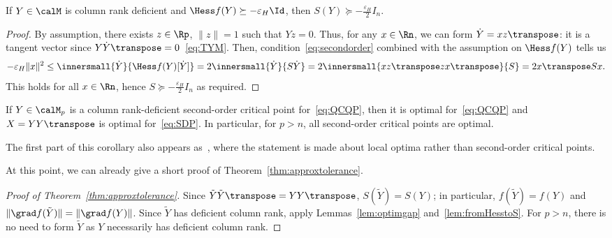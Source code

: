 \documentclass{article}
\newcommand{\1}{\mathbf{1}}
\begin{document}
\begin{lemma}\label{lem:fromHesstoS}
	If $Y\in\calM$ is column rank deficient and $\Hess f(Y) \succeq -\varepsilon_H \Id$, then $S(Y) \succeq -\frac{\varepsilon_H}{2} I_n$.
\end{lemma}
\begin{proof}
	By assumption, there exists $z\in\Rp$, $\|z\| = 1$ such that $Yz = 0$. Thus, for any $x\in\Rn$, we can form $\dot Y = xz\transpose$: it is a tangent vector since $Y\dot Y\transpose = 0$~\eqref{eq:TYM}. Then, condition~\eqref{eq:secondorder} combined with the assumption on $\Hess f(Y)$ tells us
	\begin{align*}
	-\varepsilon_H \|x\|^2 \leq \innersmall{\dot Y}{\Hess f(Y)[\dot Y]} = 2\innersmall{\dot Y}{S\dot Y} = 2\innersmall{xz\transpose z x\transpose}{S} = 2 x\transpose S x.
	\end{align*}
	This holds for all $x\in\Rn$, hence $S \succeq -\frac{\varepsilon_H}{2} I_n$ as required.
\end{proof}
\begin{corollary} \label{cor:rankdefsocpopt}
	If $Y\in\calM_p$ is a column rank-deficient second-order critical point for~\eqref{eq:QCQP}, then it is optimal for~\eqref{eq:QCQP} and $X = YY\transpose$ is optimal for~\eqref{eq:SDP}. In particular, for $p>n$, all second-order critical points are optimal.
\end{corollary}
The first part of this corollary also appears as~\cite[Prop.\,4]{sdplr}, where the statement is made about local optima rather than second-order critical points.

At this point, we can already give a short proof of Theorem~\ref{thm:approxtolerance}.
\begin{proof}[Proof of Theorem~\ref{thm:approxtolerance}]
	Since $\tilde Y \tilde Y\transpose = YY\transpose$, $S(\tilde Y) = S(Y)$; in particular, $f(\tilde Y) = f(Y)$ and $\|\grad f(\tilde Y)\| = \|\grad f(Y)\|$. Since $\tilde Y$ has deficient column rank, apply Lemmas~\ref{lem:optimgap} and~\ref{lem:fromHesstoS}. For $p>n$, there is no need to form $\tilde Y$ as $Y$ necessarily has deficient column rank.
\end{proof}
\end{document}
